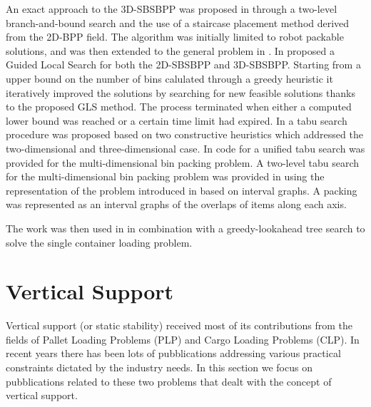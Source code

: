 An exact approach to the 3D-SBSBPP was proposed in \citep{martello2000three} through a two-level branch-and-bound search and the use of a staircase placement method derived from the 2D-BPP field.
The algorithm was initially limited to robot packable solutions, and was then extended to the general problem in \citep{martello2007exact}.
In \citep{faroe2003guided} proposed a Guided Local Search for both the 2D-SBSBPP and 3D-SBSBPP.
Starting from a upper bound on the number of bins calulated through a greedy heuristic it iteratively improved the solutions by searching for new feasible solutions thanks to the proposed GLS method.
The process terminated when either a computed lower bound was reached or a certain time limit had expired.
In \citep{lodi2002heuristic} a tabu search procedure was proposed based on two constructive heuristics which addressed the two-dimensional and three-dimensional case.
In \citep{Lodi2004} code for a unified tabu search was provided for the multi-dimensional bin packing problem.
A two-level tabu search for the multi-dimensional bin packing problem was provided in \citep{crainic2009ts2pack} using the representation of the problem introduced in \citep{fekete2004combinatorial} based on interval graphs. 
A packing was represented as an interval graphs of the overlaps of items along each axis.
\citep{parreno2010hybrid}

\citep{WU2010347}

\citep{ZHU2012452}
The work was then used in \citep{ZHU2012408} in combination with a greedy-lookahead tree search to solve the single container loading problem.

\citep{hifi2014hybrid}

\citep{gonccalves2013biased}

\citep{zudio2018brkga}

\section{Vertical Support}
\label{sec:literature:support}%
Vertical support (or static stability) received most of its contributions from the fields of Pallet Loading Problems (PLP) and Cargo Loading Problems (CLP).
In recent years there has been lots of pubblications addressing various practical constraints dictated by the industry needs.
In this section we focus on pubblications related to these two problems that dealt with the concept of vertical support.

